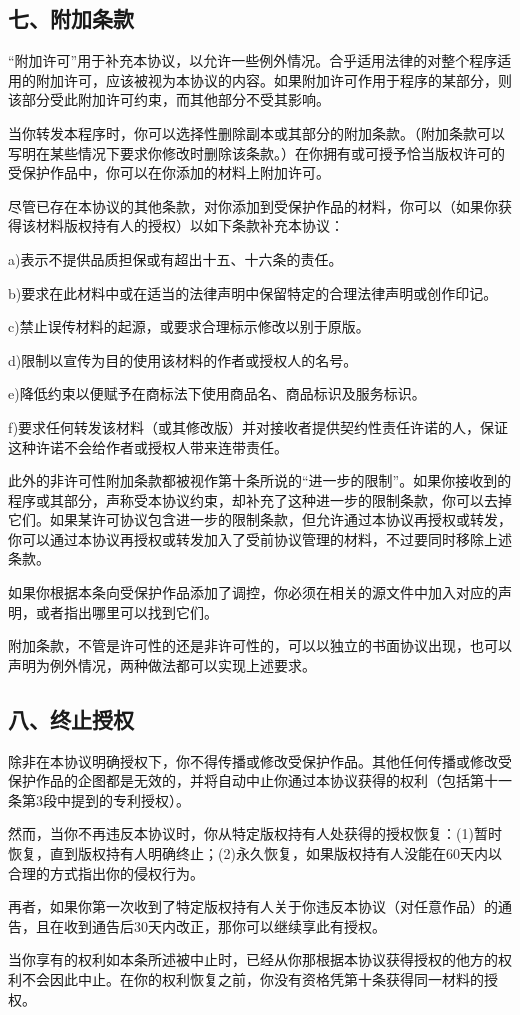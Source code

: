 \subsection{七、附加条款}
“附加许可”用于补充本协议，以允许一些例外情况。合乎适用法律的对整个程序适用的附加许可，应该被视为本协议的内容。如果附加许可作用于程序的某部分，则该部分受此附加许可约束，而其他部分不受其影响。\par
当你转发本程序时，你可以选择性删除副本或其部分的附加条款。（附加条款可以写明在某些情况下要求你修改时删除该条款。）在你拥有或可授予恰当版权许可的受保护作品中，你可以在你添加的材料上附加许可。\par
尽管已存在本协议的其他条款，对你添加到受保护作品的材料，你可以（如果你获得该材料版权持有人的授权）以如下条款补充本协议：\par
a)表示不提供品质担保或有超出十五、十六条的责任。\par
b)要求在此材料中或在适当的法律声明中保留特定的合理法律声明或创作印记。\par
c)禁止误传材料的起源，或要求合理标示修改以别于原版。\par
d)限制以宣传为目的使用该材料的作者或授权人的名号。\par
e)降低约束以便赋予在商标法下使用商品名、商品标识及服务标识。\par
f)要求任何转发该材料（或其修改版）并对接收者提供契约性责任许诺的人，保证这种许诺不会给作者或授权人带来连带责任。\par
此外的非许可性附加条款都被视作第十条所说的“进一步的限制”。如果你接收到的程序或其部分，声称受本协议约束，却补充了这种进一步的限制条款，你可以去掉它们。如果某许可协议包含进一步的限制条款，但允许通过本协议再授权或转发，你可以通过本协议再授权或转发加入了受前协议管理的材料，不过要同时移除上述条款。\par
如果你根据本条向受保护作品添加了调控，你必须在相关的源文件中加入对应的声明，或者指出哪里可以找到它们。\par
附加条款，不管是许可性的还是非许可性的，可以以独立的书面协议出现，也可以声明为例外情况，两种做法都可以实现上述要求。
\subsection{八、终止授权}
除非在本协议明确授权下，你不得传播或修改受保护作品。其他任何传播或修改受保护作品的企图都是无效的，并将自动中止你通过本协议获得的权利（包括第十一条第3段中提到的专利授权）。\par
然而，当你不再违反本协议时，你从特定版权持有人处获得的授权恢复：(1)暂时恢复，直到版权持有人明确终止；(2)永久恢复，如果版权持有人没能在60天内以合理的方式指出你的侵权行为。\par
再者，如果你第一次收到了特定版权持有人关于你违反本协议（对任意作品）的通告，且在收到通告后30天内改正，那你可以继续享此有授权。\par
当你享有的权利如本条所述被中止时，已经从你那根据本协议获得授权的他方的权利不会因此中止。在你的权利恢复之前，你没有资格凭第十条获得同一材料的授权。\par
